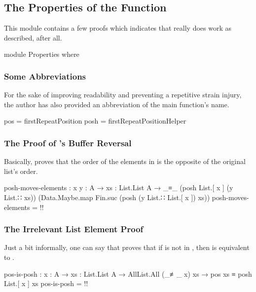 \documentclass{report}
\begin{document}
\subsection{The Properties of the Function}
This module contains a few proofs which indicates that  really does work as described, after all.

\begin{code}
  module Properties where
\end{code}

\subsubsection{Some Abbreviations}
For the sake of improving readability and preventing a repetitive strain injury, the author has also provided an abbreviation of the main function's name.

\begin{code}
    pos = firstRepeatPosition
    posh = firstRepeatPositionHelper
\end{code}

\subsubsection{The Proof of 's Buffer Reversal}
Basically,  proves that the order of the elements in  is the opposite of the original list's order.

\begin{code}
    posh-moves-elements :
      {x y : A} →
      {xs : List.List A} →
      _≡_ (posh List.[ x ] (y List.∷ xs))
          (Data.Maybe.map Fin.suc (posh (y List.∷ List.[ x ]) xs))
    posh-moves-elements = {!!}
\end{code}

\subsubsection{The Irrelevant List Element Proof}
Just a bit informally, one can say that  proves that if  is not in , then   is equivalent to  \AgdaOperator{\AgdaFunction{List.[}}  \AgdaOperator{\AgdaFunction{]}} .

\begin{code}
    pos-is-posh :
      {x : A} →
      {xs : List.List A} →
      AllList.All (_≢_ x) xs →
      pos xs ≡ posh List.[ x ] xs
    pos-is-posh = {!!}
\end{code}
\end{document}
